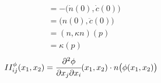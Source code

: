 \documentclass[10pt]{article}
\begin{document}
\begin{remark}
{\begin{equation*}
\begin{aligned}
                        &= -\big(\dot{n}(0), \dot{c}(0)\big) \\
                        &= \big(n(0), \ddot{c}(0)\big) \\
                        &= (n, \kappa n)(p) \\
                        &= \kappa(p)
                    \end{aligned}
                \end{equation*}}
			\begin{equation*}
				\begin{aligned}
					II_{ij}^\phi(x_1, x_2) = \cfrac{\partial^2\phi}{\partial x_j\partial x_i}(x_1,x_2)\cdot n\big(\phi(x_1,x_2)\big)
				\end{aligned}
			\end{equation*}
		\end{remark}
	
\end{document}
